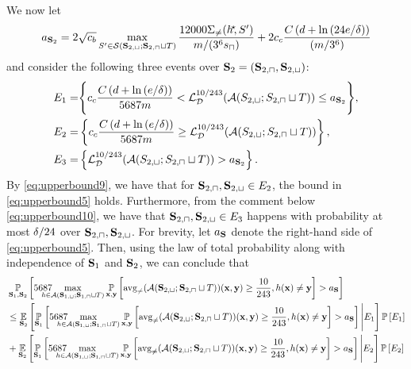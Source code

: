 \begin{proofof}{}
We now let 
\[ a_{\mathbf{S}_{2}}=2\sqrt{c_b}\max\limits_{S'\in\mathcal{S}(\mathbf{S}_{2,\sqcup};\mathbf{S}_{2,\sqcap}\sqcup T)} 
\frac{12000\Sigma_{\not=}(h^{\negmedspace\star}\negmedspace,S')}{m/(3^6 s_{\sqcap})}+2c_c \frac{C\left(d+\ln{(24e/\delta  )}\right)}{(m/3^6)} \]
and consider the following three events over $ \mathbf{S}_{2}=(\mathbf{S}_{2,\sqcap},\mathbf{S}_{2,\sqcup} )$: 
\begin{align*}
 E_{1}=&\Bigg\{c_c\frac{C\left(d+\ln{(e/\delta )}\right)}{5687m}<    \operatorname{\mathcal{L}}_{\mathcal{D}}^{10/243}(\mathcal{A}(S_{2,\sqcup};S_{2,\sqcap}\sqcup T))\leq a_{\mathbf{S}_{2}} \Bigg\},
 \\
 E_{2}=&\left\{ c_c\frac{C\left(d+\ln{(e/\delta )}\right)}{5687m}\geq   \operatorname{\mathcal{L}}_{\mathcal{D}}^{10/243}(\mathcal{A}(S_{2,\sqcup};S_{2,\sqcap}\sqcup T)) \right\},
 \\
 E_{3}=& \left\{  \operatorname{\mathcal{L}}_{\mathcal{D}}^{10/243}(\mathcal{A}(S_{2,\sqcup};S_{2,\sqcap}\sqcup T))
 > a_{\mathbf{S}_{2}} \right\}.
\end{align*}
By \cref{eq:upperbound9}, we have that for $\mathbf{S}_{2,\sqcap},\mathbf{S}_{2,\sqcup} \in E_{2} $, the bound in \cref{eq:upperbound5} holds. 
Furthermore, from the comment below \cref{eq:upperbound10}, we have that $ \mathbf{S}_{2,\sqcap},\mathbf{S}_{2,\sqcup} \in E_{3} $ happens with probability at most $ \delta/24 $ over $ \mathbf{S}_{2,\sqcap},\mathbf{S}_{2,\sqcup} $. For brevity, let $ a_{\mathbf{S}} $ denote the right-hand side of \cref{eq:upperbound5}. Then, using the law of total probability along with independence of  $ \mathbf{S}_{1}$ and  $\mathbf{S}_{2} $, we can conclude that 
\begin{align}\label{eq:upperbound16}
    &\p_{\rS_{1},\rS_{2}}\left[5687\negmedspace\negmedspace\negmedspace\negmedspace\negmedspace\negmedspace\max_{h\in \erm(\rS_{1,\sqcup};\rS_{1,\sqcap}\sqcup T)}\p_{\rx,\ry}\left[\avg(\erm(\rS_{2,\sqcup};\rS_{2,\sqcap}\sqcup T))(\rx,\ry)\geq \frac{10}{243},h(\rx)\not=\ry\right] >a_{\rS}\right]
    \\
    &\leq     
    \e_{\rS_{2}}\left[\p_{\rS_{1}}\left[5687\negmedspace\negmedspace\negmedspace\negmedspace\negmedspace\negmedspace\max_{h\in \erm(\rS_{1,\sqcup};\rS_{1,\sqcap}\sqcup T)}\p_{\rx,\ry}\left[\avg(\erm(\rS_{2,\sqcup};\rS_{2,\sqcap}\sqcup T))(\rx,\ry)\geq \frac{10}{243},h(\rx)\not=\ry\right] >a_{\rS}\right]\Bigg| E_{1}\right]\p\left[E_{1}\right]\nonumber
    \\
    &+
    \e_{\rS_{2}}\left[\p_{\rS_{1}}\left[5687\negmedspace\negmedspace\negmedspace\negmedspace\negmedspace\negmedspace\max_{h\in \erm(\rS_{1,\sqcup};\rS_{1,\sqcap}\sqcup T)}\p_{\rx,\ry}\left[\avg(\erm(\rS_{2,\sqcup};\rS_{2,\sqcap}\sqcup T))(\rx,\ry)\geq \frac{10}{243},h(\rx)\not=\ry\right] >a_{\rS}\right]\Bigg| E_{2}\right]\p\left[E_{2}\right]\nonumber

\end{align}
\end{proofof}
